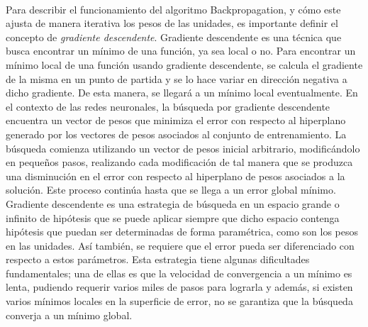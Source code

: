 \paragraph{}Para describir el funcionamiento del algoritmo Backpropagation, y cómo este ajusta de manera iterativa los pesos de las unidades, es importante definir el concepto de \textit{gradiente descendente}.
Gradiente descendente es una técnica que busca encontrar un mínimo de una función, ya sea local o no. 
Para encontrar un mínimo local de una función usando gradiente descendente, se calcula el gradiente de la misma en un punto de partida y se lo hace variar en dirección negativa a dicho gradiente.
De esta manera, se llegará a un mínimo local eventualmente.
En el contexto de las redes neuronales, la búsqueda por gradiente descendente encuentra un vector de pesos que minimiza el error con respecto al hiperplano generado por los vectores de pesos asociados al conjunto de entrenamiento.
La búsqueda comienza utilizando un vector de pesos inicial arbitrario, modificándolo en pequeños pasos, realizando cada modificación de tal manera que se produzca una disminución en el error con respecto al hiperplano de pesos asociados a la solución.
Este proceso continúa hasta que se llega a un error global mínimo.
Gradiente descendente es una estrategia de búsqueda en un espacio grande o infinito de hipótesis que se puede aplicar siempre que dicho espacio contenga hipótesis que puedan ser determinadas de forma paramétrica, como son los pesos en las unidades.
Así también, se requiere que el error pueda ser diferenciado con respecto a estos parámetros.
Esta estrategia tiene algunas dificultades fundamentales; una de ellas es que la velocidad de convergencia a un mínimo es lenta, pudiendo requerir varios miles de pasos para lograrla y además, si existen varios mínimos locales en la superficie de error, no se garantiza que la búsqueda converja a un mínimo global.

